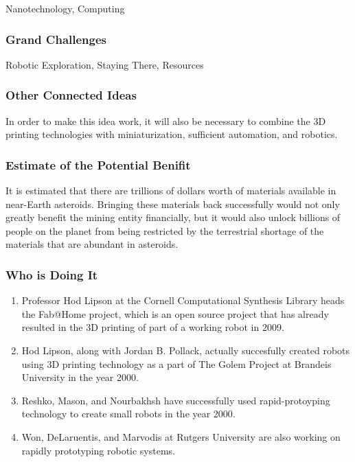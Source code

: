 \documentclass[english]{article}
\begin{document}
Nanotechnology, Computing


\subsubsection{Grand Challenges}

Robotic Exploration, Staying There, Resources


\subsubsection{Other Connected Ideas}

In order to make this idea work, it will also be necessary to combine
the 3D printing technologies with miniaturization, sufficient automation,
and robotics.


\subsubsection{Estimate of the Potential Benifit}

It is estimated that there are trillions of dollars worth of materials
available in near-Earth asteroids. Bringing these materials back successfully
would not only greatly benefit the mining entity financially, but
it would also unlock billions of people on the planet from being restricted
by the terrestrial shortage of the materials that are abundant in
asteroids.


\subsubsection{Who is Doing It}

\begin{enumerate}
\item Professor Hod Lipson at the Cornell Computational Synthesis Library
heads the Fab@Home project, which is an open source project that has
already resulted in the 3D printing of part of a working robot in
2009\cite{fabathome}.
\item Hod Lipson, along with Jordan B. Pollack, actually succesfully created
robots using 3D printing technology as a part of The Golem Project
at Brandeis University in the year 2000\cite{golem}.
\item Reshko, Mason, and Nourbakhsh have successfully used rapid-protoyping
technology to create small robots in the year 2000\cite{reshko}.
\item Won, DeLaruentis, and Marvodis at Rutgers University are also working
on rapidly prototyping robotic systems\cite{won}.
\end{enumerate}
\end{document}
